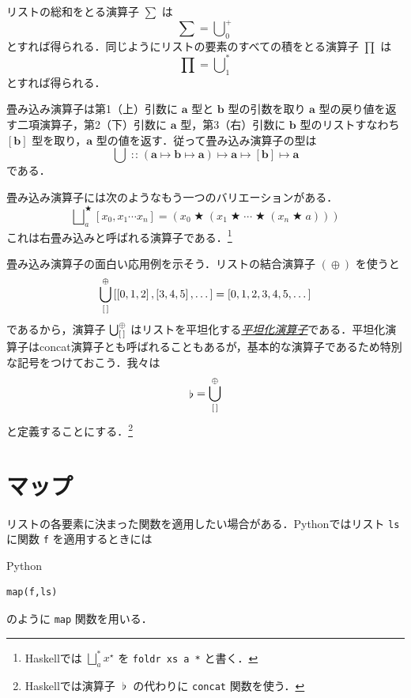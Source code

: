 \documentclass[a4paper]{jsbook}
\newcommand{\programminglanguage}[1]{\textsf{#1}}
\newcommand{\haskell}{\programminglanguage{Haskell}}
\newcommand{\python}{\programminglanguage{Python}}
\newcommand{\keyword}[1]{{\underline{\emph{#1}}}}
\newcommand{\code}[1]{\texttt{#1}}
\newenvironment{pythoncode}{\begin{itembox}[r]{\python}}{\end{itembox}}
\newcommand{\mType}[1]{\mathbf{#1}}
\newcommand{\mListType}[1]{[\mType{#1}]}
\newcommand{\mListWith}[1]{\left[#1\right]}
\newcommand{\mList}[1]{{#1}^\mathrm{\star}}
\DeclareMathOperator{\mIn}{{:\!:}}
\DeclareMathOperator{\mMapsTo}{\mapsto}
\DeclareMathOperator{\mBinOp}{\bigstar}
\DeclareMathOperator*{\mFoldLeft}{\bigcup}
\DeclareMathOperator*{\mFoldRight}{\bigsqcup}
\DeclareMathOperator{\mConcat}{\flat}
\DeclareMathOperator{\mAppend}{\oplus}
\newcommand{\mProjection}[2]{#1\mMapsTo#2}
\begin{document}
リストの総和をとる演算子 $\sum$ は
\begin{equation}
\sum=\mFoldLeft^+_0
\end{equation}
とすれば得られる．同じようにリストの要素のすべての積をとる演算子 $\prod$ は
\begin{equation}
\prod=\mFoldLeft^*_1
\end{equation}
とすれば得られる．

畳み込み演算子は第1（上）引数に $\mType{a}$ 型と $\mType{b}$ 型の引数を取り $\mType{a}$ 型の戻り値を返す二項演算子，第2（下）引数に $\mType{a}$ 型，第3（右）引数に $\mType{b}$ 型のリストすなわち $\mListType{b}$ 型を取り，$\mType{a}$ 型の値を返す．従って畳み込み演算子の型は
\begin{equation}
\mFoldLeft
\mIn{}
\mProjection{
  \mProjection{
    \mProjection{
      (\mProjection{\mType{a}}{\mProjection{\mType{b}}{\mType{a}}})
    }
    {\mType{a}}
  }
  {
    \mListType{b}
  }
}
{
  \mType{a}
}
\end{equation}
である．

畳み込み演算子には次のようなもう一つのバリエーションがある．
\begin{equation}
\mFoldRight^{\mBinOp}_{a}\mListWith{x_0,x_1\dotsb x_n}
=(x_0\mBinOp(x_1\mBinOp\dotsb\mBinOp(x_n\mBinOp a)))
\end{equation}
これは右畳み込みと呼ばれる演算子である．\footnote{\haskell では $\mFoldRight^{*}_a\mList{x}$ を \code{foldr xs a *} と書く．}

畳み込み演算子の面白い応用例を示そう．リストの結合演算子 $(\mAppend)$ を使うと
\begin{equation}
\mFoldLeft_{\mEmptyList}^{\mAppend}\mListWith{\mListWith{0,1,2},\mListWith{3,4,5},\dots}=\mListWith{0,1,2,3,4,5,\dots}
\end{equation}
であるから，演算子 $\mFoldLeft_{\mEmptyList}^{\mAppend}$ はリストを平坦化する\keyword{平坦化演算子}である．平坦化演算子はconcat演算子とも呼ばれることもあるが，基本的な演算子であるため特別な記号をつけておこう．我々は
\begin{equation}
\mConcat=\mFoldLeft_{\mEmptyList}^{\mAppend}
\end{equation}
と定義することにする．\footnote{\haskell では演算子 $\mConcat$ の代わりに \code{concat} 関数を使う．}

\section{マップ}

リストの各要素に決まった関数を適用したい場合がある．\python ではリスト \code{ls} に関数 \code{f} を適用するときには
\begin{pythoncode}
\begin{verbatim}
map(f,ls)
\end{verbatim}
\end{pythoncode}
のように \code{map} 関数を用いる．
\end{document}
